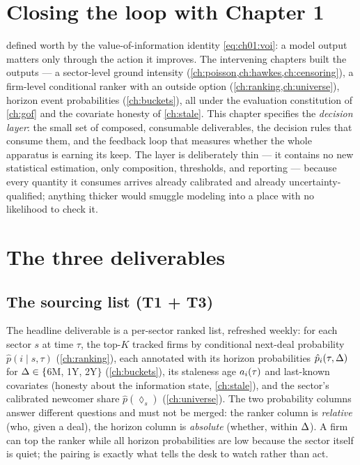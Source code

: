 
\section{Closing the loop with Chapter 1}\label{ch12:sec:loop}

 defined worth by the value-of-information identity
\cref{eq:ch01:voi}: a model output matters only through the action it
improves. The intervening chapters built the outputs --- a sector-level
ground intensity (\cref{ch:poisson,ch:hawkes,ch:censoring}), a
firm-level conditional ranker with an outside option
(\cref{ch:ranking,ch:universe}), horizon event probabilities
(\cref{ch:buckets}), all under the evaluation constitution of
\cref{ch:gof} and the covariate honesty of \cref{ch:stale}. This chapter
specifies the \emph{decision layer}: the small set of composed,
consumable deliverables, the decision rules that consume them, and the
feedback loop that measures whether the whole apparatus is earning its
keep. The layer is deliberately thin --- it contains no new statistical
estimation, only composition, thresholds, and reporting --- because every
quantity it consumes arrives already calibrated and already
uncertainty-qualified; anything thicker would smuggle modeling into a
place with no likelihood to check it.

\section{The three deliverables}\label{ch12:sec:deliverables}

\subsection{The sourcing list (T1 + T3)}

The headline deliverable is a per-sector ranked list, refreshed weekly:
for each sector $s$ at time $\tau$, the top-$K$ tracked firms by
conditional next-deal probability $\hat p(i \mid s, \tau)$
(\cref{ch:ranking}), each annotated with its horizon probabilities
$\hat p_i(\tau, \Delta)$ for $\Delta \in \{$6M, 1Y, 2Y$\}$
(\cref{ch:buckets}), its staleness age $a_i(\tau)$ and last-known
covariates (honesty about the information state, \cref{ch:stale}), and
the sector's calibrated newcomer share $\hat p(\lozenge_s)$
(\cref{ch:universe}). The two probability columns answer different
questions and must not be merged: the ranker column is \emph{relative}
(who, given a deal), the horizon column is \emph{absolute} (whether,
within $\Delta$). A firm can top the ranker while all horizon
probabilities are low because the sector itself is quiet; the pairing is
exactly what tells the desk to watch rather than act.

